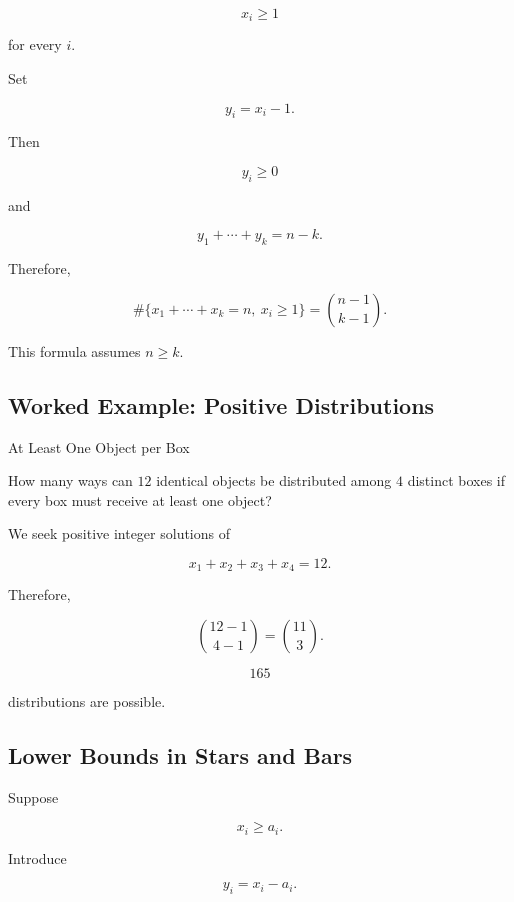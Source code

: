 \[
x_i\geq1
\]

for every \(i\).

Set

\[
y_i=x_i-1.
\]

Then

\[
y_i\geq0
\]

and

\[
y_1+\cdots+y_k=n-k.
\]

Therefore,

\[
\boxed{
\#\{x_1+\cdots+x_k=n,\ x_i\geq1\}
=
\binom{n-1}{k-1}.
}
\]

This formula assumes \(n\geq k\).

\subsection{Worked Example: Positive Distributions}
\label{subsec:worked-positive-distributions}

\begin{workedexamplebox}{At Least One Object per Box}

How many ways can \(12\) identical objects be distributed among \(4\)
distinct boxes if every box must receive at least one object?

We seek positive integer solutions of

\[
x_1+x_2+x_3+x_4=12.
\]

Therefore,

\[
\binom{12-1}{4-1}
=
\binom{11}{3}.
\]

\begin{answerbox}
\[
\boxed{
165
}
\]

distributions are possible.
\end{answerbox}

\end{workedexamplebox}

\subsection{Lower Bounds in Stars and Bars}
\label{subsec:stars-bars-lower-bounds}

Suppose

\[
x_i\geq a_i.
\]

Introduce

\[
y_i=x_i-a_i.
\]

